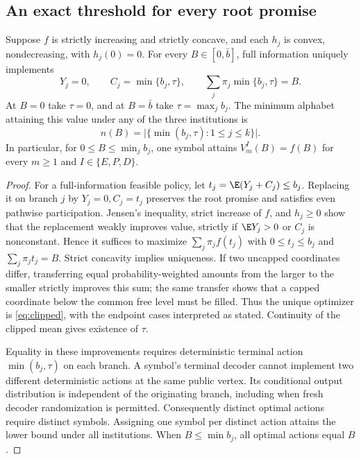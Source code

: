 \subsection{An exact threshold for every root promise}
\begin{theorem}\label{thm:clipped}
Suppose $f$ is strictly increasing and strictly concave, and each $h_j$ is convex, nondecreasing, with $h_j(0)=0$. For every $B\in[0,\bar b]$, full information uniquely implements
\begin{equation}\label{eq:clipped}
 Y_j=0,\qquad C_j=\min\{b_j,\tau\},\qquad
 \sum_j\pi_j\min\{b_j,\tau\}=B.
\end{equation}
At $B=0$ take $\tau=0$, and at $B=\bar b$ take $\tau=\max_jb_j$. The minimum alphabet attaining this value under any of the three institutions is
\[
 n(B)=\bigl|\{\min(b_j,\tau):1\leq j\leq k\}\bigr|.
\]
In particular, for $0\leq B\leq\min_jb_j$, one symbol attains $V_m^I(B)=f(B)$ for every $m\geq1$ and $I\in\{E,P,D\}$.
\end{theorem}
\begin{proof}
For a full-information feasible policy, let $t_j=\E(Y_j+C_j)\leq b_j$. Replacing it on branch $j$ by $Y_j=0,C_j=t_j$ preserves the root promise and satisfies even pathwise participation. Jensen's inequality, strict increase of $f$, and $h_j\geq0$ show that the replacement weakly improves value, strictly if $\E Y_j>0$ or $C_j$ is nonconstant. Hence it suffices to maximize $\sum_j\pi_j f(t_j)$ with $0\leq t_j\leq b_j$ and $\sum_j\pi_jt_j=B$. Strict concavity implies uniqueness. If two uncapped coordinates differ, transferring equal probability-weighted amounts from the larger to the smaller strictly improves this sum; the same transfer shows that a capped coordinate below the common free level must be filled. Thus the unique optimizer is \eqref{eq:clipped}, with the endpoint cases interpreted as stated. Continuity of the clipped mean gives existence of $\tau$.

Equality in these improvements requires deterministic terminal action $\min(b_j,\tau)$ on each branch. A symbol's terminal decoder cannot implement two different deterministic actions at the same public vertex. Its conditional output distribution is independent of the originating branch, including when fresh decoder randomization is permitted. Consequently distinct optimal actions require distinct symbols. Assigning one symbol per distinct action attains the lower bound under all institutions. When $B\leq\min b_j$, all optimal actions equal $B$.
\end{proof}

